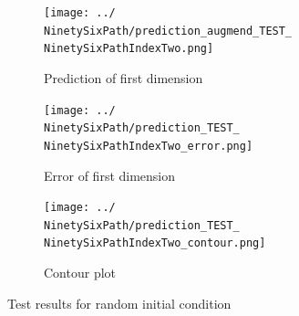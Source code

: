 	\begin{figure}[h]
		\centering
		\begin{subfigure}[b]{0.45\textwidth}
			\texttt{[image: ../\\NinetySixPath/prediction\_augmend\_TEST\_\\NinetySixPathIndexTwo.png]}
			\caption{Prediction of first dimension}
		\end{subfigure}
		\begin{subfigure}[b]{0.45\textwidth}
			\texttt{[image: ../\\NinetySixPath/prediction\_TEST\_\\NinetySixPathIndexTwo\_error.png]}
			\caption{Error of first dimension}
		\end{subfigure}
		\begin{subfigure}[b]{\textwidth}
			\texttt{[image: ../\\NinetySixPath/prediction\_TEST\_\\NinetySixPathIndexTwo\_contour.png]}
			\caption{Contour plot}
		\end{subfigure}
		\caption{Test results for random initial condition \NinetySixPathIndexTwo}
		\label{96:predictions2}
	\end{figure}
	